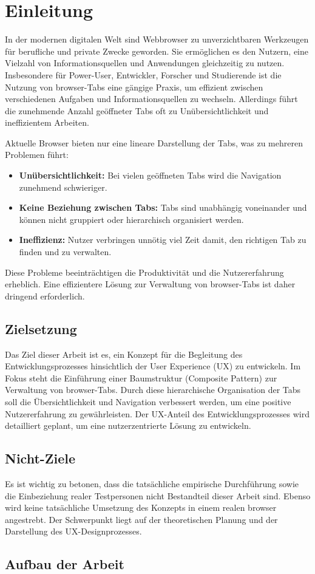 \section{Einleitung}
In der modernen digitalen Welt sind Webbrowser zu unverzichtbaren Werkzeugen für berufliche und private Zwecke geworden. 
Sie ermöglichen es den Nutzern, eine Vielzahl von Informationsquellen und Anwendungen gleichzeitig zu nutzen. 
Insbesondere für Power-User, Entwickler, Forscher und Studierende ist die Nutzung von \gls{browser}-Tabs eine gängige Praxis, um effizient zwischen verschiedenen Aufgaben und Informationsquellen zu wechseln. 
Allerdings führt die zunehmende Anzahl geöffneter Tabs oft zu Unübersichtlichkeit und ineffizientem Arbeiten.

Aktuelle Browser bieten nur eine lineare Darstellung der Tabs, was zu mehreren Problemen führt:
\begin{itemize}
    \item \textbf{Unübersichtlichkeit:} Bei vielen geöffneten Tabs wird die Navigation zunehmend schwieriger.
    \item \textbf{Keine Beziehung zwischen Tabs:} Tabs sind unabhängig voneinander und können nicht gruppiert oder hierarchisch organisiert werden.
    \item \textbf{Ineffizienz:} Nutzer verbringen unnötig viel Zeit damit, den richtigen Tab zu finden und zu verwalten.
\end{itemize}
Diese Probleme beeinträchtigen die Produktivität und die Nutzererfahrung erheblich. 
Eine effizientere Lösung zur Verwaltung von \gls{browser}-Tabs ist daher dringend erforderlich.

\subsection{Zielsetzung}
Das Ziel dieser Arbeit ist es, ein Konzept für die Begleitung des Entwicklungsprozesses hinsichtlich der User Experience (UX) zu entwickeln. 
Im Fokus steht die Einführung einer Baumstruktur (Composite Pattern) zur Verwaltung von \gls{browser}-Tabs. 
Durch diese hierarchische Organisation der Tabs soll die Übersichtlichkeit und Navigation verbessert werden, um eine positive Nutzererfahrung zu gewährleisten. 
Der UX-Anteil des Entwicklungsprozesses wird detailliert geplant, um eine nutzerzentrierte Lösung zu entwickeln.

\subsection{Nicht-Ziele}
Es ist wichtig zu betonen, dass die tatsächliche empirische Durchführung sowie die Einbeziehung realer Testpersonen nicht Bestandteil dieser Arbeit sind. 
Ebenso wird keine tatsächliche Umsetzung des Konzepts in einem realen \gls{browser} angestrebt. 
Der Schwerpunkt liegt auf der theoretischen Planung und der Darstellung des UX-Designprozesses.

\subsection{Aufbau der Arbeit}
